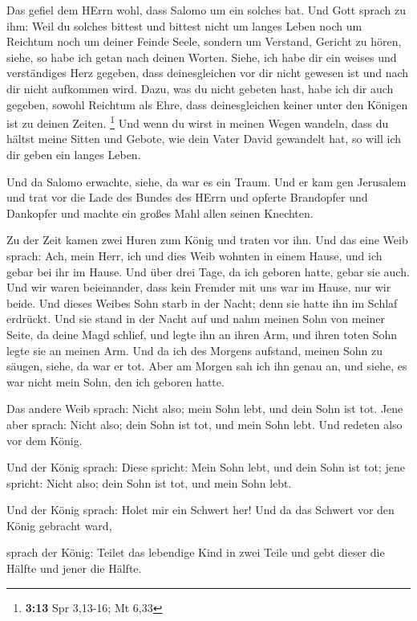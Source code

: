  Das gefiel dem HErrn wohl, dass Salomo um ein solches bat.
 Und Gott sprach zu ihm: Weil du solches bittest und
bittest nicht um langes Leben noch um Reichtum noch um deiner Feinde
Seele, sondern um Verstand, Gericht zu hören,  siehe, so
habe ich getan nach deinen Worten. Siehe, ich habe dir ein weises und
verständiges Herz gegeben, dass deinesgleichen vor dir nicht gewesen ist
und nach dir nicht aufkommen wird.  Dazu, was du nicht
gebeten hast, habe ich dir auch gegeben, sowohl Reichtum als Ehre, dass
deinesgleichen keiner unter den Königen ist zu deinen Zeiten.
\footnote{\textbf{3:13} Spr 3,13-16; Mt 6,33}  Und wenn du
wirst in meinen Wegen wandeln, dass du hältst meine Sitten und Gebote,
wie dein Vater David gewandelt hat, so will ich dir geben ein langes
Leben.

 Und da Salomo erwachte, siehe, da war es ein Traum. Und er
kam gen Jerusalem und trat vor die Lade des Bundes des HErrn und opferte
Brandopfer und Dankopfer und machte ein großes Mahl allen seinen
Knechten.

 Zu der Zeit kamen zwei Huren zum König und traten vor ihn.
 Und das eine Weib sprach: Ach, mein Herr, ich und dies
Weib wohnten in einem Hause, und ich gebar bei ihr im Hause.
 Und über drei Tage, da ich geboren hatte, gebar sie auch.
Und wir waren beieinander, dass kein Fremder mit uns war im Hause, nur
wir beide.  Und dieses Weibes Sohn starb in der Nacht; denn
sie hatte ihn im Schlaf erdrückt.  Und sie stand in der
Nacht auf und nahm meinen Sohn von meiner Seite, da deine Magd schlief,
und legte ihn an ihren Arm, und ihren toten Sohn legte sie an meinen
Arm.  Und da ich des Morgens aufstand, meinen Sohn zu
säugen, siehe, da war er tot. Aber am Morgen sah ich ihn genau an, und
siehe, es war nicht mein Sohn, den ich geboren hatte.

 Das andere Weib sprach: Nicht also; mein Sohn lebt, und
dein Sohn ist tot. Jene aber sprach: Nicht also; dein Sohn ist tot, und
mein Sohn lebt. Und redeten also vor dem König.

 Und der König sprach: Diese spricht: Mein Sohn lebt, und
dein Sohn ist tot; jene spricht: Nicht also; dein Sohn ist tot, und mein
Sohn lebt.

 Und der König sprach: Holet mir ein Schwert her! Und da
das Schwert vor den König gebracht ward,

 sprach der König: Teilet das lebendige Kind in zwei Teile
und gebt dieser die Hälfte und jener die Hälfte.

